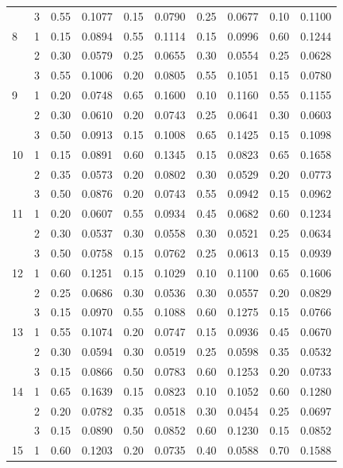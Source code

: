 \begin{longtable}{llcccccccc}
   & 3 & 0.55 & 0.1077 & 0.15 & 0.0790 & 0.25 & 0.0677 & 0.10 & 0.1100 \\ 
  8 & 1 & 0.15 & 0.0894 & 0.55 & 0.1114 & 0.15 & 0.0996 & 0.60 & 0.1244 \\ 
   & 2 & 0.30 & 0.0579 & 0.25 & 0.0655 & 0.30 & 0.0554 & 0.25 & 0.0628 \\ 
   & 3 & 0.55 & 0.1006 & 0.20 & 0.0805 & 0.55 & 0.1051 & 0.15 & 0.0780 \\ 
  9 & 1 & 0.20 & 0.0748 & 0.65 & 0.1600 & 0.10 & 0.1160 & 0.55 & 0.1155 \\ 
   & 2 & 0.30 & 0.0610 & 0.20 & 0.0743 & 0.25 & 0.0641 & 0.30 & 0.0603 \\ 
   & 3 & 0.50 & 0.0913 & 0.15 & 0.1008 & 0.65 & 0.1425 & 0.15 & 0.1098 \\ 
  10 & 1 & 0.15 & 0.0891 & 0.60 & 0.1345 & 0.15 & 0.0823 & 0.65 & 0.1658 \\ 
   & 2 & 0.35 & 0.0573 & 0.20 & 0.0802 & 0.30 & 0.0529 & 0.20 & 0.0773 \\ 
   & 3 & 0.50 & 0.0876 & 0.20 & 0.0743 & 0.55 & 0.0942 & 0.15 & 0.0962 \\ 
  11 & 1 & 0.20 & 0.0607 & 0.55 & 0.0934 & 0.45 & 0.0682 & 0.60 & 0.1234 \\ 
   & 2 & 0.30 & 0.0537 & 0.30 & 0.0558 & 0.30 & 0.0521 & 0.25 & 0.0634 \\ 
   & 3 & 0.50 & 0.0758 & 0.15 & 0.0762 & 0.25 & 0.0613 & 0.15 & 0.0939 \\ 
  12 & 1 & 0.60 & 0.1251 & 0.15 & 0.1029 & 0.10 & 0.1100 & 0.65 & 0.1606 \\ 
   & 2 & 0.25 & 0.0686 & 0.30 & 0.0536 & 0.30 & 0.0557 & 0.20 & 0.0829 \\ 
   & 3 & 0.15 & 0.0970 & 0.55 & 0.1088 & 0.60 & 0.1275 & 0.15 & 0.0766 \\ 
  13 & 1 & 0.55 & 0.1074 & 0.20 & 0.0747 & 0.15 & 0.0936 & 0.45 & 0.0670 \\ 
   & 2 & 0.30 & 0.0594 & 0.30 & 0.0519 & 0.25 & 0.0598 & 0.35 & 0.0532 \\ 
   & 3 & 0.15 & 0.0866 & 0.50 & 0.0783 & 0.60 & 0.1253 & 0.20 & 0.0733 \\ 
  14 & 1 & 0.65 & 0.1639 & 0.15 & 0.0823 & 0.10 & 0.1052 & 0.60 & 0.1280 \\ 
   & 2 & 0.20 & 0.0782 & 0.35 & 0.0518 & 0.30 & 0.0454 & 0.25 & 0.0697 \\ 
   & 3 & 0.15 & 0.0890 & 0.50 & 0.0852 & 0.60 & 0.1230 & 0.15 & 0.0852 \\ 
  15 & 1 & 0.60 & 0.1203 & 0.20 & 0.0735 & 0.40 & 0.0588 & 0.70 & 0.1588 \\ 

\end{longtable}

